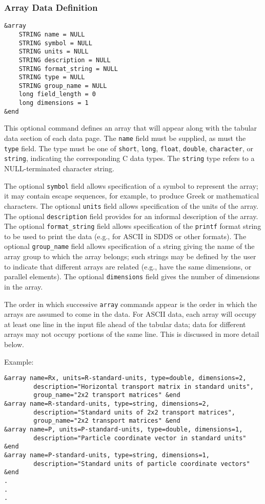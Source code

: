 \documentclass[11pt]{article}
\begin{document}
\subsubsection{Array Data Definition}

\begin{verbatim}
&array 
    STRING name = NULL
    STRING symbol = NULL
    STRING units = NULL
    STRING description = NULL
    STRING format_string = NULL
    STRING type = NULL
    STRING group_name = NULL
    long field_length = 0
    long dimensions = 1
&end
\end{verbatim}

This optional command defines an array that will appear along with the tabular data section of each data page.  The {\tt name} field must be supplied, as must the {\tt type} field.  The type must be one of {\tt short}, {\tt long}, {\tt float}, {\tt double}, {\tt character}, or {\tt string}, indicating the corresponding C data types.  The {\tt string} type refers to a NULL-terminated character string.

The optional {\tt symbol} field allows specification of a symbol to represent the array; it may contain escape sequences, for example, to produce Greek or mathematical characters.  The optional {\tt units} field allows specification of the units of the array.  The optional {\tt description} field provides for an informal description of the array.  The optional {\tt format\_string} field allows specification of the {\tt printf} format string to be used to print the data (e.g., for ASCII in SDDS or other formats).  The optional {\tt group\_name} field allows specification of a string giving the name of the array group to which the array belongs; such strings may be defined by the user to indicate that different arrays are related (e.g., have the same dimensions, or parallel elements). The optional {\tt dimensions} field gives the number of dimensions in the array.

The order in which successive {\tt array} commands appear is the order in which the arrays are assumed to come in the data.  For ASCII data, each array will occupy at least one line in the input file ahead of the tabular data; data for different arrays may not occupy portions of the same line.  This is discussed in more detail below.

Example:
\begin{verbatim}
&array name=Rx, units=R-standard-units, type=double, dimensions=2,
        description="Horizontal transport matrix in standard units",
        group_name="2x2 transport matrices" &end
&array name=R-standard-units, type=string, dimensions=2, 
        description="Standard units of 2x2 transport matrices",
        group_name="2x2 transport matrices" &end
&array name=P, units=P-standard-units, type=double, dimensions=1, 
        description="Particle coordinate vector in standard units" &end
&array name=P-standard-units, type=string, dimensions=1, 
        description="Standard units of particle coordinate vectors" &end
.
.
.
\end{verbatim}
\end{document}

